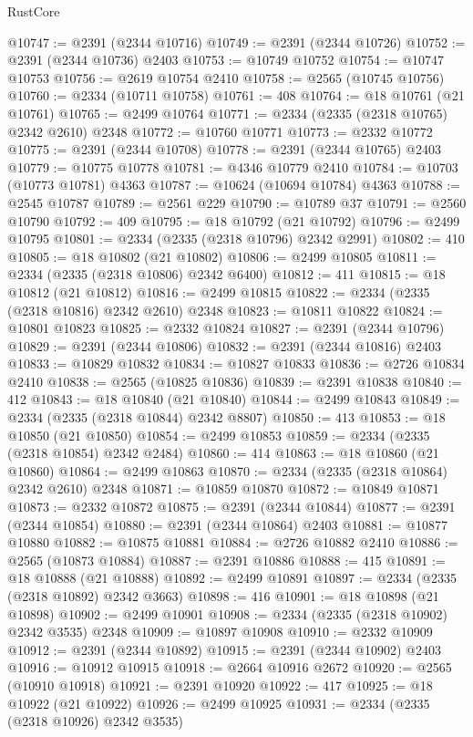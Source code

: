 \begin{lexlean}{RustCore}
\begin{coremodule}
@10747 := @2391 (@2344 @10716)
@10749 := @2391 (@2344 @10726)
@10752 := @2391 (@2344 @10736) @2403
@10753 := @10749 @10752
@10754 := @10747 @10753
@10756 := @2619 @10754 @2410
@10758 := @2565 (@10745 @10756)
@10760 := @2334 (@10711 @10758)
@10761 := 408
@10764 := @18 @10761 (@21 @10761)
@10765 := @2499 @10764
@10771 := @2334 (@2335 (@2318 @10765) @2342 @2610) @2348
@10772 := @10760 @10771
@10773 := @2332 @10772
@10775 := @2391 (@2344 @10708)
@10778 := @2391 (@2344 @10765) @2403
@10779 := @10775 @10778
@10781 := @4346 @10779 @2410
@10784 := @10703 (@10773 @10781) @4363
@10787 := @10624 (@10694 @10784) @4363
@10788 := @2545 @10787
@10789 := @2561 @229
@10790 := @10789 @37
@10791 := @2560 @10790
@10792 := 409
@10795 := @18 @10792 (@21 @10792)
@10796 := @2499 @10795
@10801 := @2334 (@2335 (@2318 @10796) @2342 @2991)
@10802 := 410
@10805 := @18 @10802 (@21 @10802)
@10806 := @2499 @10805
@10811 := @2334 (@2335 (@2318 @10806) @2342 @6400)
@10812 := 411
@10815 := @18 @10812 (@21 @10812)
@10816 := @2499 @10815
@10822 := @2334 (@2335 (@2318 @10816) @2342 @2610) @2348
@10823 := @10811 @10822
@10824 := @10801 @10823
@10825 := @2332 @10824
@10827 := @2391 (@2344 @10796)
@10829 := @2391 (@2344 @10806)
@10832 := @2391 (@2344 @10816) @2403
@10833 := @10829 @10832
@10834 := @10827 @10833
@10836 := @2726 @10834 @2410
@10838 := @2565 (@10825 @10836)
@10839 := @2391 @10838
@10840 := 412
@10843 := @18 @10840 (@21 @10840)
@10844 := @2499 @10843
@10849 := @2334 (@2335 (@2318 @10844) @2342 @8807)
@10850 := 413
@10853 := @18 @10850 (@21 @10850)
@10854 := @2499 @10853
@10859 := @2334 (@2335 (@2318 @10854) @2342 @2484)
@10860 := 414
@10863 := @18 @10860 (@21 @10860)
@10864 := @2499 @10863
@10870 := @2334 (@2335 (@2318 @10864) @2342 @2610) @2348
@10871 := @10859 @10870
@10872 := @10849 @10871
@10873 := @2332 @10872
@10875 := @2391 (@2344 @10844)
@10877 := @2391 (@2344 @10854)
@10880 := @2391 (@2344 @10864) @2403
@10881 := @10877 @10880
@10882 := @10875 @10881
@10884 := @2726 @10882 @2410
@10886 := @2565 (@10873 @10884)
@10887 := @2391 @10886
@10888 := 415
@10891 := @18 @10888 (@21 @10888)
@10892 := @2499 @10891
@10897 := @2334 (@2335 (@2318 @10892) @2342 @3663)
@10898 := 416
@10901 := @18 @10898 (@21 @10898)
@10902 := @2499 @10901
@10908 := @2334 (@2335 (@2318 @10902) @2342 @3535) @2348
@10909 := @10897 @10908
@10910 := @2332 @10909
@10912 := @2391 (@2344 @10892)
@10915 := @2391 (@2344 @10902) @2403
@10916 := @10912 @10915
@10918 := @2664 @10916 @2672
@10920 := @2565 (@10910 @10918)
@10921 := @2391 @10920
@10922 := 417
@10925 := @18 @10922 (@21 @10922)
@10926 := @2499 @10925
@10931 := @2334 (@2335 (@2318 @10926) @2342 @3535)

\end{coremodule}
\end{lexlean}
